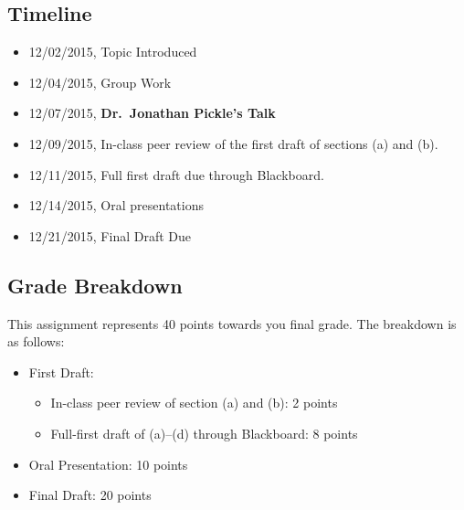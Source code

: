 \documentclass[10pt]{article}
\providecommand{\tightlist}{%
  \setlength{\itemsep}{0pt}\setlength{\parskip}{0pt}}
\begin{document}
\subsection{Timeline}\label{timeline}

\begin{itemize}
\tightlist
\item
  12/02/2015, Topic Introduced
\item
  12/04/2015, Group Work
\item
  12/07/2015, \textbf{Dr.~Jonathan Pickle's Talk}
\item
  12/09/2015, In-class peer review of the first draft of sections (a)
  and (b).
\item
  12/11/2015, Full first draft due through Blackboard.
\item
  12/14/2015, Oral presentations
\item
  12/21/2015, Final Draft Due
\end{itemize}

\subsection{Grade Breakdown}\label{grade-breakdown}

This assignment represents 40 points towards you final grade. The
breakdown is as follows:

\begin{itemize}
\tightlist
\item
  First Draft:

  \begin{itemize}
  \tightlist
  \item
    In-class peer review of section (a) and (b): 2 points
  \item
    Full-first draft of (a)--(d) through Blackboard: 8 points
  \end{itemize}
\item
  Oral Presentation: 10 points
\item
  Final Draft: 20 points
\end{itemize}
\end{document}
